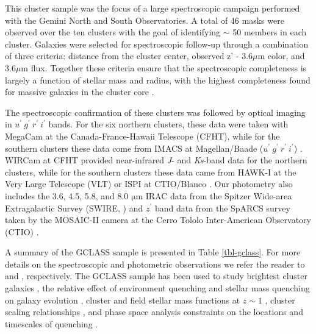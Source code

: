 This cluster sample was the focus of a large spectroscopic campaign performed with the Gemini North and South Observatories. A total of 46 masks were observed over the ten clusters with the goal of identifying $\sim$ 50 members in each cluster. Galaxies were selected for spectroscopic follow-up through a combination of three criteria: distance from the cluster center, observed z' - 3.6$\mu$m color, and 3.6$\mu$m flux. Together these criteria ensure that the spectroscopic completeness is largely a function of stellar mass and radius, with the highest completeness found for massive galaxies in the cluster core \citep{Muzzin:2012dw}. %

The spectroscopic confirmation of these clusters was followed by optical imaging in $u^\prime\ g^\prime\ r^\prime\ i^\prime$ bands. For the six northern clusters, these data were taken with MegaCam at the Canada-France-Hawaii Telescope (CFHT), while for the southern clusters these data come from IMACS at Magellan/Baade ($u^\prime\ g^\prime\ r^\prime\ i^\prime$) . WIRCam at CFHT provided near-infrared \textit{J}- and \textit{Ks}-band data for the northern clusters, while for the southern clusters these data came from HAWK-I at the Very Large Telescope (VLT) or ISPI at CTIO/Blanco \citep{van-der-Burg:2013zn}. Our photometry also includes the 3.6, 4.5, 5.8, and 8.0 $\mathrm{\mu}$m IRAC data from the Spitzer Wide-area Extragalactic Survey (SWIRE, \citet{Lonsdale:2003ow}) and $z^\prime$ band data from the SpARCS survey taken by the MOSAIC-II camera at the Cerro Tololo Inter-American Observatory (CTIO)
\citep[see][for details on the Northern and Southern $z^\prime$ observations, respectively]{Muzzin:2009jm,Wilson:2009ws}.

A summary of the GCLASS sample is presented in Table \ref{tbl-gclass}. For more details on the spectroscopic and photometric observations we refer the reader to \citet{Muzzin:2012dw} and \citet{van-der-Burg:2013zn}, respectively.  The GCLASS sample has been used to study brightest cluster galaxies \citep[][Rettura et al., in prep.]{Lidman:2012il,Lidman:2013vp}, the relative effect of environment quenching and stellar mass quenching on galaxy evolution \citep{Muzzin:2012dw}, cluster and field stellar mass functions at $z\sim1$ \citep{van-der-Burg:2013zn}, cluster scaling relationships \citep{van-der-Burg:2014bs}, and phase space analysis constraints on the locations and timescales of quenching \citep{Noble:2013vh,Muzzin:2014sf}.

